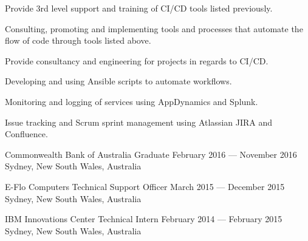 \begin{experiences}
{\begin{cvitems}
      \item {Provide 3rd level support and training of CI/CD tools listed previously.}
      \item {Consulting, promoting and implementing tools and processes that automate the flow of code through tools listed above.}
      \item {Provide consultancy and engineering for projects in regards to CI/CD.}
      \item {Developing and using Ansible scripts to automate workflows.}
      \item {Monitoring and logging of services using AppDynamics and Splunk.}
      \item {Issue tracking and Scrum sprint management using Atlassian JIRA and Confluence.}
    \end{cvitems}
  }

  \expitem
  {Commonwealth Bank of Australia} %
  {Graduate} %
  {February 2016 --- November 2016} %
  {Sydney, New South Wales, Australia} %
  {} %
  {} %
  {} %

  \expitem
  {E-Flo Computers} %
  {Technical Support Officer} %
  {March 2015 --- December 2015} %
  {Sydney, New South Wales, Australia} %
  {} %
  {} %
  {} %

  \expitem
  {IBM} %
  {Innovations Center Technical Intern} %
  {February 2014 --- February 2015} %
  {Sydney, New South Wales, Australia} %
  {} %
  {} %
  {} %

\end{experiences}
